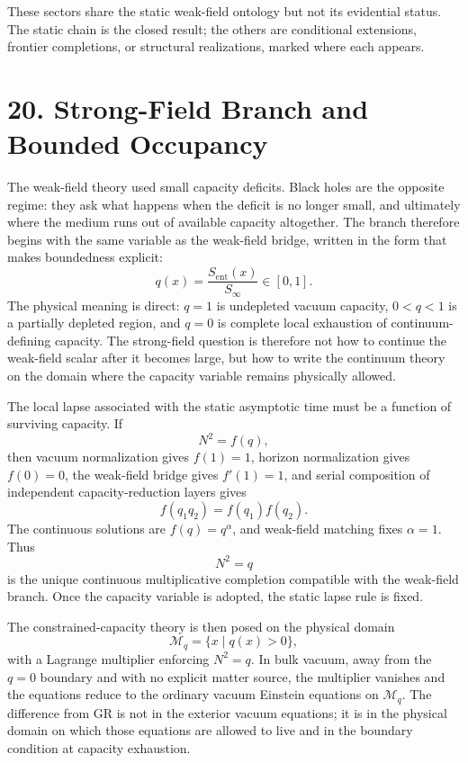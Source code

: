 \documentclass[11pt]{article}
\begin{document}
These sectors share the static weak-field ontology but not its evidential status. The static chain is the closed result; the others are conditional extensions, frontier completions, or structural realizations, marked where each appears.

\section{20. Strong-Field Branch and Bounded Occupancy}

The weak-field theory used small capacity deficits. Black holes are the opposite regime: they ask what happens when the deficit is no longer small, and ultimately where the medium runs out of available capacity altogether. The branch therefore begins with the same variable as the weak-field bridge, written in the form that makes boundedness explicit:
\[
q(x)=\frac{S_{\mathrm{ent}}(x)}{S_\infty}\in[0,1].
\]
The physical meaning is direct: $q=1$ is undepleted vacuum capacity, $0<q<1$ is a partially depleted region, and $q=0$ is complete local exhaustion of continuum-defining capacity. The strong-field question is therefore not how to continue the weak-field scalar after it becomes large, but how to write the continuum theory on the domain where the capacity variable remains physically allowed.

The local lapse associated with the static asymptotic time must be a function of surviving capacity. If
\[
N^2=f(q),
\]
then vacuum normalization gives $f(1)=1$, horizon normalization gives $f(0)=0$, the weak-field bridge gives $f'(1)=1$, and serial composition of independent capacity-reduction layers gives
\[
f(q_1q_2)=f(q_1)f(q_2).
\]
The continuous solutions are $f(q)=q^\alpha$, and weak-field matching fixes $\alpha=1$. Thus
\[
N^2=q
\]
is the unique continuous multiplicative completion compatible with the weak-field branch. Once the capacity variable is adopted, the static lapse rule is fixed.

The constrained-capacity theory is then posed on the physical domain
\[
\mathcal{M}_q=\{x\mid q(x)>0\},
\]
with a Lagrange multiplier enforcing $N^2=q$. In bulk vacuum, away from the $q=0$ boundary and with no explicit matter source, the multiplier vanishes and the equations reduce to the ordinary vacuum Einstein equations on $\mathcal{M}_q$. The difference from GR is not in the exterior vacuum equations; it is in the physical domain on which those equations are allowed to live and in the boundary condition at capacity exhaustion.
\end{document}
